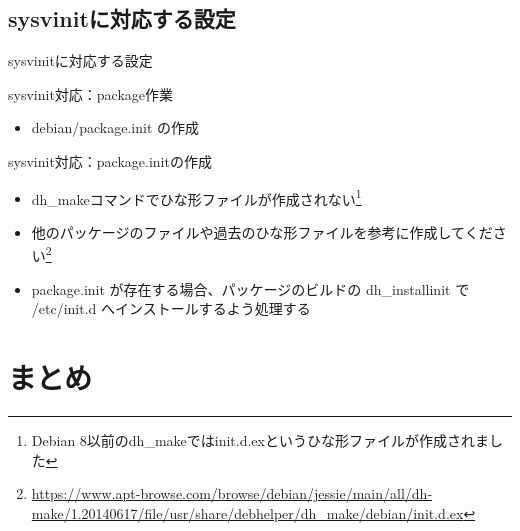 \subsection{sysvinitに対応する設定}

\begin{frame}
  \begin{center}\Huge{sysvinitに対応する設定}\end{center}
\end{frame} 

\begin{frame}[containsverbatim]{sysvinit対応：package作業}
  \begin{itemize}
  \item debian/package.init の作成
  \end{itemize}
\end{frame}


\begin{frame}[containsverbatim]{sysvinit対応：package.initの作成}

  \begin{itemize}
  \item dh\_makeコマンドでひな形ファイルが作成されない\footnote{Debian 8以前のdh\_makeではinit.d.exというひな形ファイルが作成されました}
  \item 他のパッケージのファイルや過去のひな形ファイルを参考に作成してください\footnote{\url{https://www.apt-browse.com/browse/debian/jessie/main/all/dh-make/1.20140617/file/usr/share/debhelper/dh_make/debian/init.d.ex}}
  \item package.init が存在する場合、パッケージのビルドの dh\_installinit で /etc/init.d へインストールするよう処理する
  \end{itemize}

\end{frame}


\section{まとめ}

